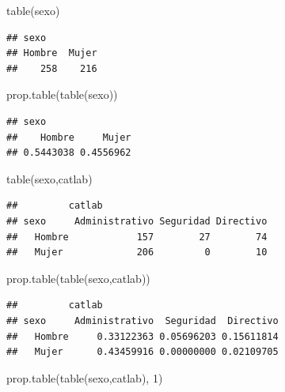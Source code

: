 \documentclass[
]{book}
\newenvironment{Shaded}{\begin{snugshade}}{\end{snugshade}}
\newcommand{\DecValTok}[1]{\textcolor[rgb]{0.00,0.00,0.81}{#1}}
\newcommand{\FunctionTok}[1]{\textcolor[rgb]{0.00,0.00,0.00}{#1}}
\newcommand{\NormalTok}[1]{#1}
\theoremstyle{break}
\begin{document}
\begin{Shaded}
\begin{Highlighting}[]
\FunctionTok{table}\NormalTok{(sexo)}
\end{Highlighting}
\end{Shaded}

\begin{verbatim}
## sexo
## Hombre  Mujer 
##    258    216
\end{verbatim}

\begin{Shaded}
\begin{Highlighting}[]
\FunctionTok{prop.table}\NormalTok{(}\FunctionTok{table}\NormalTok{(sexo))}
\end{Highlighting}
\end{Shaded}

\begin{verbatim}
## sexo
##    Hombre     Mujer 
## 0.5443038 0.4556962
\end{verbatim}

\begin{Shaded}
\begin{Highlighting}[]
\FunctionTok{table}\NormalTok{(sexo,catlab)}
\end{Highlighting}
\end{Shaded}

\begin{verbatim}
##         catlab
## sexo     Administrativo Seguridad Directivo
##   Hombre            157        27        74
##   Mujer             206         0        10
\end{verbatim}

\begin{Shaded}
\begin{Highlighting}[]
\FunctionTok{prop.table}\NormalTok{(}\FunctionTok{table}\NormalTok{(sexo,catlab))}
\end{Highlighting}
\end{Shaded}

\begin{verbatim}
##         catlab
## sexo     Administrativo  Seguridad  Directivo
##   Hombre     0.33122363 0.05696203 0.15611814
##   Mujer      0.43459916 0.00000000 0.02109705
\end{verbatim}

\begin{Shaded}
\begin{Highlighting}[]
\FunctionTok{prop.table}\NormalTok{(}\FunctionTok{table}\NormalTok{(sexo,catlab), }\DecValTok{1}\NormalTok{)}
\end{Highlighting}
\end{Shaded}
\end{document}
